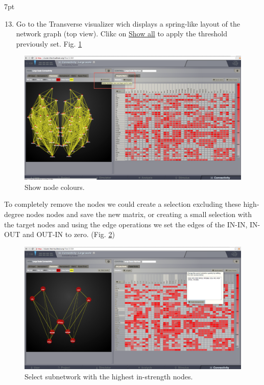 \documentclass{tufte-handout}
\newenvironment{formal}{%
  \def\FrameCommand{%
    \hspace{1pt}%
    {\color{DarkBlue}\vrule width 2pt}%
    {\color{formalshade}\vrule width 4pt}%
    \colorbox{formalshade}%
  }%
  \MakeFramed{\advance\hsize-\width\FrameRestore}%
  \noindent\hspace{-4.55pt}%
  \begin{adjustwidth}{}{7pt}%
  \vspace{2pt}\vspace{2pt}%
}
{%
  \vspace{2pt}\end{adjustwidth}\endMakeFramed%
}
\begin{document}
\begin{formal}
  \begin{enumerate}[resume] %
  \setcounter{enumi}{12}
  \item Go to the Transverse visualizer wich displays a spring-like layout of the network graph (top view). Clikc on \underline{Show all} to apply the threshold previously set. Fig. \ref{fig:step_12}
  \end{enumerate}
\end{formal}

\begin{figure}[h]
  \includegraphics[width=0.9\linewidth]{Handout_UI_ModellingStructuralLesions_ShowColourNodes}%
  \caption{Show node colours.}%
  \label{fig:step_12}%
\end{figure}
\newpage

To completely remove the nodes we could create a selection excluding these
high-degree nodes nodes and save the new matrix, or creating a small selection
with the target nodes and using the edge operations we set the edges of the
IN-IN, IN-OUT and OUT-IN to zero. (Fig. \ref{fig:step_subnetwork})


\begin{figure}[h]
  \includegraphics[width=0.9\linewidth]{Handout_UI_ModellingStructuralLesions_SelectSubnetwork}%
  \caption{Select subnetwork with the highest in-strength nodes.}%
  \label{fig:step_subnetwork}%
\end{figure}
\newpage
\end{document}

